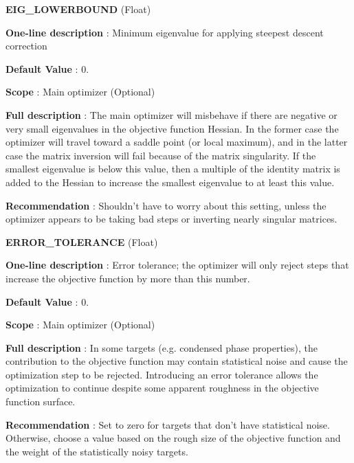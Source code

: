 \begin{DoxyItemize}
\item {\bfseries  \-E\-I\-G\-\_\-\-L\-O\-W\-E\-R\-B\-O\-U\-N\-D } (\-Float) \par
{\bfseries  \-One-\/line description }\-: \-Minimum eigenvalue for applying steepest descent correction \par
{\bfseries  \-Default \-Value }\-: 0. \par
{\bfseries  \-Scope }\-: \-Main optimizer (\-Optional) \par
{\bfseries  \-Full description }\-: \-The main optimizer will misbehave if there are negative or very small eigenvalues in the objective function \-Hessian. \-In the former case the optimizer will travel toward a saddle point (or local maximum), and in the latter case the matrix inversion will fail because of the matrix singularity. \-If the smallest eigenvalue is below this value, then a multiple of the identity matrix is added to the \-Hessian to increase the smallest eigenvalue to at least this value. \par
{\bfseries  \-Recommendation }\-: \-Shouldn't have to worry about this setting, unless the optimizer appears to be taking bad steps or inverting nearly singular matrices.\end{DoxyItemize}
\begin{DoxyItemize}
\item {\bfseries  \-E\-R\-R\-O\-R\-\_\-\-T\-O\-L\-E\-R\-A\-N\-C\-E } (\-Float) \par
{\bfseries  \-One-\/line description }\-: \-Error tolerance; the optimizer will only reject steps that increase the objective function by more than this number. \par
{\bfseries  \-Default \-Value }\-: 0. \par
{\bfseries  \-Scope }\-: \-Main optimizer (\-Optional) \par
{\bfseries  \-Full description }\-: \-In some targets (e.\-g. condensed phase properties), the contribution to the objective function may contain statistical noise and cause the optimization step to be rejected. \-Introducing an error tolerance allows the optimization to continue despite some apparent roughness in the objective function surface. \par
{\bfseries  \-Recommendation }\-: \-Set to zero for targets that don't have statistical noise. \-Otherwise, choose a value based on the rough size of the objective function and the weight of the statistically noisy targets.\end{DoxyItemize}
